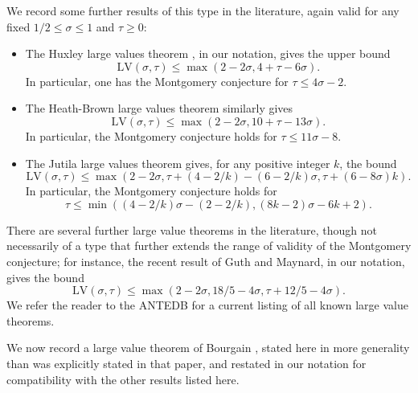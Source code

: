 \documentclass[a4paper, 10pt]{amsart}
\newcommand{\LV}{\mathrm{LV}}
\begin{document}
We record some further results of this type in the literature, again valid for any fixed  $1/2 \leq \sigma \leq 1$ and $\tau\geq 0$:
\begin{itemize}
\item[(i)]  The Huxley large values theorem \cite[Equation~(2.9)]{Huxley}, in our notation, gives the upper bound
\begin{equation}\label{huxley-lvt}
     \LV(\sigma,\tau) \leq \max( 2-2\sigma, 4 + \tau - 6 \sigma).
\end{equation}
In particular, one has the Montgomery conjecture for $\tau \leq 4 \sigma - 2$.
\item[(ii)] The Heath-Brown large values theorem \cite[p. 226]{heathbrown_zero_1979} similarly gives
\begin{equation}\label{hb-opt}
    \LV(\sigma,\tau) \leq \max( 2-2\sigma, 10 + \tau - 13 \sigma).
\end{equation}
In particular, the Montgomery conjecture holds for $\tau \leq 11 \sigma - 8$.
\item[(iii)] The Jutila large values theorem \cite[(1.4)]{jutila_zero_density_1977} gives, for any positive integer $k$, the bound
\begin{equation}\label{jutila-lvt}
    \LV(\sigma,\tau) \leq \max(2-2\sigma, \tau + (4-2/k) - (6-2/k)\sigma, \tau + (6-8\sigma)k).
\end{equation}
In particular, the Montgomery conjecture holds for
$$ \tau \leq \min( (4-2/k)\sigma - (2-2/k), (8k-2)\sigma - 6k + 2).$$
\end{itemize}

There are several further large value theorems in the literature, though not necessarily of a type that further extends the range of validity of the Montgomery conjecture; for instance, the recent result \cite[Theorem~1.1]{guth-maynard} of Guth and Maynard, in our notation, gives the bound
\begin{equation}\label{guth-maynard-lvt}
    \LV(\sigma,\tau) \leq \max(2-2\sigma, 18/5 - 4 \sigma, \tau + 12/5 - 4\sigma).
\end{equation}
We refer the reader to the ANTEDB for a current listing of all known large value theorems.

We now record a large value theorem of Bourgain \cite{bourgain_large_2000}, stated here in more generality than was explicitly stated in that paper, and restated in our notation for compatibility with the other results listed here.
\end{document}
